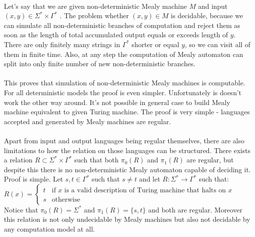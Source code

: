 \documentclass[12pt]{article}
\begin{document}
\paragraph{} Let's say that we are given non-deterministic Mealy machine $M$ and input $(x,y) \in \Sigma^* \times \Gamma^*$ . The problem whether $(x,y) \in M$ is decidable, because we can simulate all non-deterministic branches of computation and reject them as soon as the length of total accumulated output equals or exceeds length of $y$. There are only finitely many strings in $\Gamma^*$ shorter or equal $y$, so we can visit all of them in finite time. Also, at any step the computation of Mealy automaton can split into only finite number of new non-deterministic branches. 

\paragraph{} This proves that simulation of non-deterministic Mealy machines is computable. For all deterministic models the proof is even simpler. Unfortunately is doesn't work the other way around. It's not possible in general case to build Mealy machine equivalent to given Turing machine. The proof is very simple - languages accepted and generated by Mealy machines are regular. 

\paragraph{} Apart from input and output languages being regular themselves, there are also limitations to how the relation on those languages can be structured. There exists a relation $ R \subset \Sigma^* \times \Gamma^*$
such that both $\pi_0(R)$ and $\pi_1(R)$ are regular, but despite this there is no non-deterministic Mealy automaton capable of deciding it. Proof is simple. Let $s,t\in \Gamma^*$ such that $s\ne t$ and let $R:\Sigma^* \rightarrow \Gamma^*$ such that: \\
$R(x) = \begin{cases}
t & \mbox{if }  x  \mbox{ is a valid description of Turing machine that halts on } x   \\
s & \mbox{otherwise} 
\end{cases}$ \\
Notice that $\pi_0(R) = \Sigma^*$ and $\pi_1(R) = \{s,t\}$ and both are regular. Moreover this relation is not only undecidable by Mealy machines but also not decidable by any computation model at all.
\end{document}
